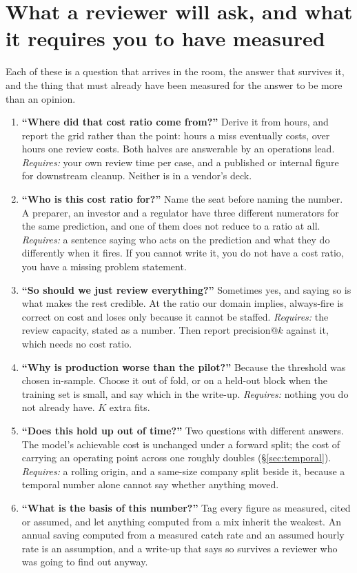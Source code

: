 \documentclass[11pt]{article}
\begin{document}
\section{What a reviewer will ask, and what it requires you to have measured}

Each of these is a question that arrives in the room, the answer that survives it, and the thing
that must already have been measured for the answer to be more than an opinion.

\begin{enumerate}[label=\textbf{\arabic*.}]
\item \textbf{``Where did that cost ratio come from?''} Derive it from hours, and report the grid
rather than the point: hours a miss eventually costs, over hours one review costs. Both halves
are answerable by an operations lead. \emph{Requires:} your own review time per case, and a
published or internal figure for downstream cleanup. Neither is in a vendor's deck.

\item \textbf{``Who is this cost ratio for?''} Name the seat before naming the number. A
preparer, an investor and a regulator have three different numerators for the same prediction,
and one of them does not reduce to a ratio at all. \emph{Requires:} a sentence saying who acts on
the prediction and what they do differently when it fires. If you cannot write it, you do not
have a cost ratio, you have a missing problem statement.

\item \textbf{``So should we just review everything?''} Sometimes yes, and saying so is what
makes the rest credible. At the ratio our domain implies, always-fire is correct on cost and
loses only because it cannot be staffed. \emph{Requires:} the review capacity, stated as a
number. Then report $\mathrm{precision}@k$ against it, which needs no cost ratio.

\item \textbf{``Why is production worse than the pilot?''} Because the threshold was chosen
in-sample. Choose it out of fold, or on a held-out block when the training set is small, and say
which in the write-up. \emph{Requires:} nothing you do not already have. $K$ extra fits.

\item \textbf{``Does this hold up out of time?''} Two questions with different answers. The
model's achievable cost is unchanged under a forward split; the cost of carrying an operating
point across one roughly doubles (\S\ref{sec:temporal}). \emph{Requires:} a rolling origin, and a
same-size company split beside it, because a temporal number alone cannot say whether anything
moved.

\item \textbf{``What is the basis of this number?''} Tag every figure as measured, cited or
assumed, and let anything computed from a mix inherit the weakest. An annual saving computed from
a measured catch rate and an assumed hourly rate is an assumption, and a write-up that says so
survives a reviewer who was going to find out anyway.
\end{enumerate}
\end{document}
